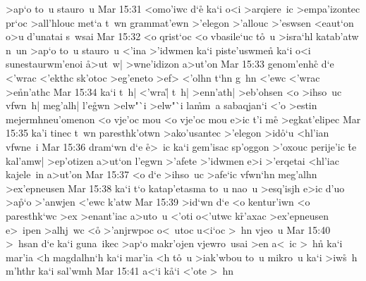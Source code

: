 >ap`o
to~u
stauro~u\bibvsend
\vs Mar 15:31
<omo'iwc
d`e\r{}
ka`i
o<i
>arqiere~ic
>empa'izontec
pr`oc
>all'hlouc
met`a
t~wn
grammat'ewn
>'elegon
>'allouc
>'eswsen
<eaut`on
o>u
d'unatai
s~wsai\bibvsend
\vs Mar 15:32
<o
qrist`oc
<o
vbasile`uc
t\r{o}~u
>isra`hl
katab'atw
n~un
>ap`o
to~u
stauro~u
<'ina
>'idwmen
ka`i
piste'uswme\r{n}
ka`i
o<i
sunestaurwm'enoi
\r{a}>ut~w|
>wne'idizon
a>ut'on\bibvsend
\vs Mar 15:33
genom'enhc\r{}
d`e
<'wrac
<'ekthc
sk'otoc
>eg'eneto
>ef>
<'olhn
t`hn
g~hn
<'ewc
<'wrac
>e\r{n}n'athc\bibvsend
{}
\vs Mar 15:34
ka`i
t~h|
<'wra|\r{}
t~h|
>enn'ath|
>eb'ohsen
<o
>ihso~uc
vfwn~h|
meg'alh|
l'e\r{g}wn
>elw"`i
>elw"`i
la\r{m}m~a
sabaqjan`i
<'o
>estin
mejermhneu'omenon
<o
vje'oc
mou
<o
vje'oc
mou
e>ic
t'i
me\r{}
>egkat'elipec\bibvsend
\vs Mar 15:35
ka'i
tinec
t~wn
paresthk'otwn
>ako'usantec
>'elegon
>id\r{o}`u
<hl'ian
vfwne~i\bibvsend
\vs Mar 15:36
dram`wn
d`e
\r{e}>~ic
ka`i
gem'isac
sp'oggon
>'oxouc
perije'ic
\r{t}e
kal'amw|
>ep'otizen
a>ut`on
l'egwn
>'afete
>'idwmen
e>i
>'erqetai
<hl'iac
kajele~in
a>ut'on\bibvsend
\vs Mar 15:37
<o
d`e
>ihso~uc
>afe`ic
vfwn`hn
meg'alhn
>ex'epneusen\bibvsend
\vs Mar 15:38
ka`i
t`o
katap'etasma
to~u
nao~u
>esq'isjh
e>ic
d'uo
>a\r{p}`o
>'anwjen
<'ewc
k'atw\bibvsend
\vs Mar 15:39
>id`wn
d`e
<o
kentur'iwn
<o
paresthk`wc
>ex
>enant'iac
a>uto~u
<'oti
o<'utwc
k\r{r}'axac
>ex'epneusen
e>~ipen
>alhj~wc
<o\r{}
>'anjrwpoc
o<~utoc
u<i`oc
>~hn
vjeo~u\bibvsend
\vs Mar 15:40
>~hsan
d`e
ka`i
guna~ikec
>ap`o
makr'ojen
vjewro~usai
>en
a<~ic
>~h\r{n}
ka`i
mar'ia
<h
magdalhn`h
ka`i
mar'ia
<h
t\r{o}~u
>iak'wbou
to~u
mikro~u
ka`i
>iw\r{s}~h
m'hthr
ka`i
sal'wmh\bibvsend
\vs Mar 15:41
a<`i
k\r{a}`i
<'ote
>~hn
